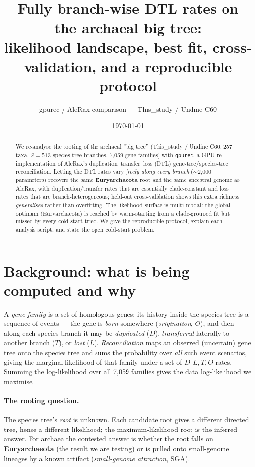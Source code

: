 \documentclass[11pt]{article}
\title{Fully branch-wise DTL rates on the archaeal big tree:\\
likelihood landscape, best fit, cross-validation, and a reproducible protocol}
\author{gpurec / AleRax comparison --- This\_study / Undine C60}
\date{\today}
\newcommand{\code}[1]{\texttt{\small #1}}
\begin{document}
\maketitle

\begin{abstract}
We re-analyse the rooting of the archaeal ``big tree'' (This\_study / Undine C60: 257
taxa, $S=513$ species-tree branches, 7{,}059 gene families) with \code{gpurec}, a GPU
re-implementation of AleRax's duplication--transfer--loss (DTL) gene-tree/species-tree
reconciliation. Letting the DTL rates vary \emph{freely along every branch}
($\sim$2{,}000 parameters) recovers the same \textbf{Euryarchaeota} root and the same
ancestral genome as AleRax, with duplication/transfer rates that are essentially
clade-constant and loss rates that are branch-heterogeneous; held-out cross-validation
shows this extra richness \emph{generalises} rather than overfitting. The likelihood
surface is multi-modal: the global optimum (Euryarchaeota) is reached by warm-starting from
a clade-grouped fit but missed by every cold start tried. We give the reproducible protocol,
explain each analysis script, and state the open cold-start problem.
\end{abstract}

\section{Background: what is being computed and why}
\label{sec:bg}
A \emph{gene family} is a set of homologous genes; its history inside the species tree is a
sequence of events --- the gene is \emph{born} somewhere (\emph{origination}, $O$), and then
along each species branch it may be \emph{duplicated} ($D$), \emph{transferred} laterally to
another branch ($T$), or \emph{lost} ($L$). \emph{Reconciliation} maps an observed
(uncertain) gene tree onto the species tree and sums the probability over \emph{all} such
event scenarios, giving the marginal likelihood of that family under a set of $D,L,T,O$
rates. Summing the log-likelihood over all 7{,}059 families gives the data log-likelihood we
maximise.

\paragraph{The rooting question.} The species tree's \emph{root} is unknown. Each candidate
root gives a different directed tree, hence a different likelihood; the maximum-likelihood
root is the inferred answer. For archaea the contested answer is whether the root falls on
\textbf{Euryarchaeota} (the result we are testing) or is pulled onto small-genome lineages by
a known artifact (\emph{small-genome attraction}, SGA).
\end{document}
